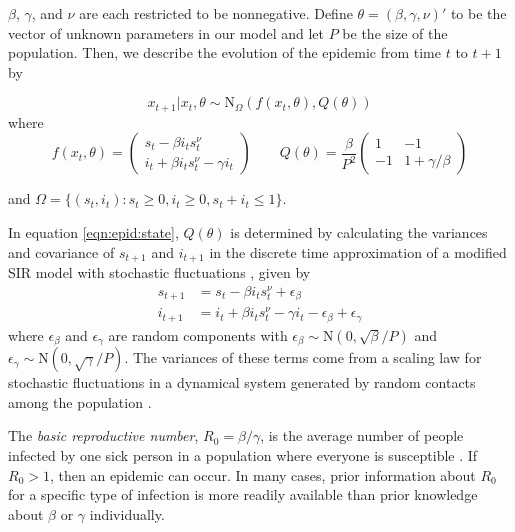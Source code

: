 \noindent $\beta$, $\gamma$, and $\nu$ are each restricted to be nonnegative. Define $\theta = (\beta,\gamma,\nu)'$ to be the vector of unknown parameters in our model and let $P$ be the size of the population. Then, we describe the evolution of the epidemic from time $t$ to $t + 1$ by

\begin{equation}
x_{t+1}\left|x_t,\theta\right. \sim \mbox{N}_\Omega\left(f(x_t,\theta),Q(\theta)\right) \label{eqn:epid:state}
\end{equation}
\noindent where
\[
f(x_t,\theta) = \left(
\begin{array}{c}
s_t - \beta i_ts^\nu_t \phantom{- \gamma i_t}\,\, \\
i_t +  \beta i_ts^\nu_t - \gamma i_t
\end{array}
\right)
\qquad
Q(\theta) = \frac{\beta}{P^2} \left(
\begin{array}{ccccc}
1 & -1 \\
-1 & 1 + \gamma/\beta
\end{array}
\right)
\]

\noindent and $\Omega = \{(s_t,i_t): s_t \ge 0, i_t \ge 0, s_t + i_t \le 1\}$.

In equation \eqref{eqn:epid:state}, $Q(\theta)$ is determined by calculating the variances and covariance of $s_{t+1}$ and $i_{t+1}$ in the discrete time approximation of a modified SIR model with stochastic fluctuations \citep{herwaarden1995stochepid, dangerfield2009stochepid, anderson2004sars}, given by
\begin{align*}
s_{t+1} &= s_t - \beta i_ts^\nu_t + \epsilon_\beta \\
i_{t+1} &= i_t + \beta i_ts^\nu_t - \gamma i_t - \epsilon_\beta + \epsilon_\gamma
\end{align*}
where $\epsilon_\beta$ and $\epsilon_\gamma$ are random components with $\epsilon_\beta \sim \mbox{N}(0, \sqrt{\beta} / P)$ and $\epsilon_\gamma \sim \mbox{N}(0, \sqrt{\gamma} / P)$. The variances of these terms come from a scaling law for stochastic fluctuations in a dynamical system generated by random contacts among the population \citep{ovaskainen2010extinction, herwaarden1995stochepid, dangerfield2009stochepid, skvortsov2012monitoring}.

The \emph{basic reproductive number}, $R_0 = \beta / \gamma$, is the average number of people infected by one sick person in a population where everyone is susceptible \citep{heff2005repratio}. If $R_0 > 1$, then an epidemic can occur. In many cases, prior information about $R_0$ for a specific type of infection is more readily available than prior knowledge about $\beta$ or $\gamma$ individually.

